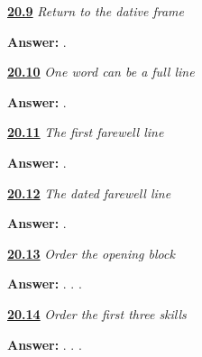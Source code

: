 \noindent\begin{minipage}[t]{\linewidth}
\raggedright
\hyperlink{review-MR-A1M09-understanding-line-check}{\textbf{20.9}} \emph{Return to the dative frame}\par
\small \textbf{Answer:}   .\par
\end{minipage}\par\medskip

\noindent\begin{minipage}[t]{\linewidth}
\raggedright
\hyperlink{review-MR-A1M10-thanks-line-check}{\textbf{20.10}} \emph{One word can be a full line}\par
\small \textbf{Answer:} .\par
\end{minipage}\par\medskip

\noindent\begin{minipage}[t]{\linewidth}
\raggedright
\hyperlink{review-MR-A1M11-again-line-check}{\textbf{20.11}} \emph{The first farewell line}\par
\small \textbf{Answer:}  .\par
\end{minipage}\par\medskip

\noindent\begin{minipage}[t]{\linewidth}
\raggedright
\hyperlink{review-MR-A1M12-tomorrow-line-check}{\textbf{20.12}} \emph{The dated farewell line}\par
\small \textbf{Answer:}  .\par
\end{minipage}\par\medskip

\noindent\begin{minipage}[t]{\linewidth}
\raggedright
\hyperlink{review-MR-A1M13-opening-block-check}{\textbf{20.13}} \emph{Order the opening block}\par
\small \textbf{Answer:}  .    .   .\par
\end{minipage}\par\medskip

\noindent\begin{minipage}[t]{\linewidth}
\raggedright
\hyperlink{review-MR-A1M14-skills-block-one-check}{\textbf{20.14}} \emph{Order the first three skills}\par
\small \textbf{Answer:}   .   .    .\par
\end{minipage}\par\medskip

